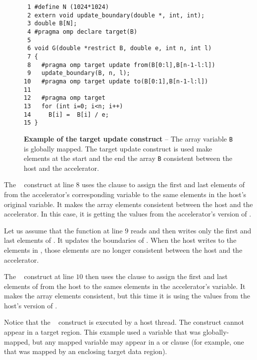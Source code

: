 \begin{figure*}[!tb]
\begin{verbatim}
 1 #define N (1024*1024)
 2 extern void update_boundary(double *, int, int);
 3 double B[N];
 4 #pragma omp declare target(B)
 5 
 6 void G(double *restrict B, double e, int n, int l)
 7 {
 8   #pragma omp target update from(B[0:l],B[n-1-l:l])
 9   update_boundary(B, n, l);
10   #pragma omp target update to(B[0:1],B[n-1-l:l])
11 
12   #pragma omp target
13   for (int i=0; i<n; i++)
14     B[i] =  B[i] / e;
15 }
\end{verbatim}
\caption{ \textbf {Example of the target update construct} -- \small
          The array variable \texttt{B} is globally mapped.  The target update
          construct is used make elements at the start and the end the
          array \texttt{B} consistent between the host and the accelerator.
         }
\label{figure:chapter6-target-update-v1}
\end{figure*}

The ~ construct at line $8$ uses the 
clause to assign the first and last  elements of  from the accelerator's
corresponding  variable to the same elements in the host's original 
variable.  It makes the array elements consistent between the host and the
accelerator.  In this case, it is getting the values from the accelerator's
version of .

Let us assume that the function  at line $9$ reads and then
writes only the  first and last elements of . It updates the boundaries
of .  When the host writes to the elements in , those elements are no
longer consistent between the host and the accelerator.

The ~ construct at line $10$ then uses the 
clause to assign the first and last  elements of  from the host to the
sames elements in the accelerator's  variable.  It makes the array elements
consistent, but this time it is using the values from the host's version of
.

Notice that the ~ construct is executed by a host thread.
The construct cannot appear in a target region.  This example used a variable
that was globally-mapped, but any mapped variable may appear in a  or
 clause (for example, one that was mapped by an enclosing target data
region).

